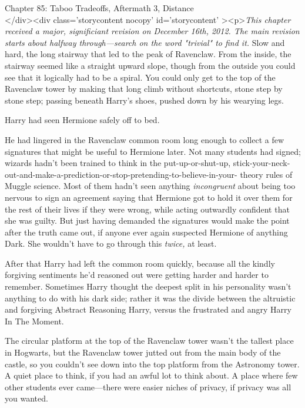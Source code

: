 
Chapter 85: Taboo Tradeoffs, Aftermath 3, Distance\\
</div><div  class='storycontent nocopy' id='storycontent' ><p>\emph{This 
chapter received a major, significiant revision on December 16th, 2012. The 
main revision starts about halfway through---search on the word "trivial" to 
find it.}
\sbreak
Slow and hard, the long stairway that led to the peak of Ravenclaw. From the 
inside, the stairway seemed like a straight upward slope, though from the 
outside you could see that it logically had to be a spiral. You could only get 
to the top of the Ravenclaw tower by making that long climb without shortcuts, 
stone step by stone step; passing beneath Harry's shoes, pushed down by his 
wearying legs.

Harry had seen Hermione safely off to bed.

He had lingered in the Ravenclaw common room long enough to collect a few 
signatures that might be useful to Hermione later. Not many students had 
signed; wizards hadn't been trained to think in the put-up-or-shut-up, 
stick-your-neck-out-and-make-a-prediction-or-stop-pretending-to-believe-in-your-
theory rules of Muggle science. Most of them hadn't seen anything 
\emph{incongruent} about being too nervous to sign an agreement saying that 
Hermione got to hold it over them for the rest of their lives if they were 
wrong, while acting outwardly confident that she was guilty. But just having 
demanded the signatures would make the point after the truth came out, if 
anyone ever again suspected Hermione of anything Dark. She wouldn't have to go 
through this \emph{twice,} at least.

After that Harry had left the common room quickly, because all the kindly 
forgiving sentiments he'd reasoned out were getting harder and harder to 
remember. Sometimes Harry thought the deepest split in his personality wasn't 
anything to do with his dark side; rather it was the divide between the 
altruistic and forgiving Abstract Reasoning Harry, versus the frustrated and 
angry Harry In The Moment.

The circular platform at the top of the Ravenclaw tower wasn't the tallest 
place in Hogwarts, but the Ravenclaw tower jutted out from the main body of the 
castle, so you couldn't see down into the top platform from the Astronomy 
tower. A quiet place to think, if you had an awful lot to think about. A place 
where few other students ever came---there were easier niches of privacy, if 
privacy was all you wanted.

